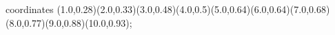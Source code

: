 					coordinates { (1.0,0.28)(2.0,0.33)(3.0,0.48)(4.0,0.5)(5.0,0.64)(6.0,0.64)(7.0,0.68)(8.0,0.77)(9.0,0.88)(10.0,0.93)};